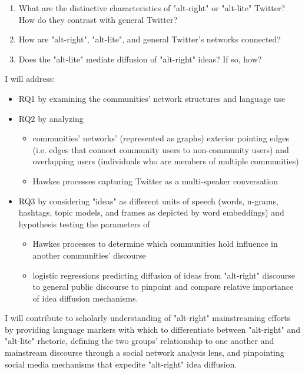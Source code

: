 \documentclass[acmlarge, screen, authorversion]{acmart}
\begin{document}
\begin{enumerate}[font={\bfseries},label={{RQ}\arabic*.}]
	\item What are the distinctive characteristics of "alt-right" or "alt-lite"
  Twitter? How do they contrast with general Twitter?

	\item How are "alt-right", "alt-lite", and general Twitter's networks
  connected?

	\item Does the "alt-lite" mediate diffusion of "alt-right" ideas? If so, how?
\end{enumerate}

I will address:
\begin{itemize}
	\item RQ1 by examining the communities’ network structures and language use
	\item RQ2 by analyzing
	      \begin{itemize}
	      	\item communities’ networks’ (represented as graphs) exterior pointing edges
	      	      (i.e. edges that connect community users to non-community users) and
	      	      overlapping users (individuals who are members of multiple communities)
	      	\item Hawkes processes capturing Twitter as a multi-speaker
	      	      conversation
	      \end{itemize}
	\item RQ3 by considering "ideas" as different units of speech (words, n-grams, hashtags, topic models, and frames as depicted by word embeddings) and hypothesis testing the parameters of
	      \begin{itemize}
	      	\item Hawkes
	      	      processes to determine which communities hold influence in another
	      	      communities’ discourse
	      	\item logistic regressions predicting diffusion of ideas from
	      	      "alt-right" discourse to general public discourse to pinpoint and compare relative importance of idea diffusion mechanisms.
	      \end{itemize}
\end{itemize}

I will contribute to scholarly understanding of "alt-right"
mainstreaming efforts by providing language markers with which to differentiate between
"alt-right" and "alt-lite" rhetoric, defining the two groups' relationship to one another and
mainstream discourse through a social network analysis lens, and pinpointing social media mechanisms
that expedite "alt-right" idea diffusion.
\end{document}
